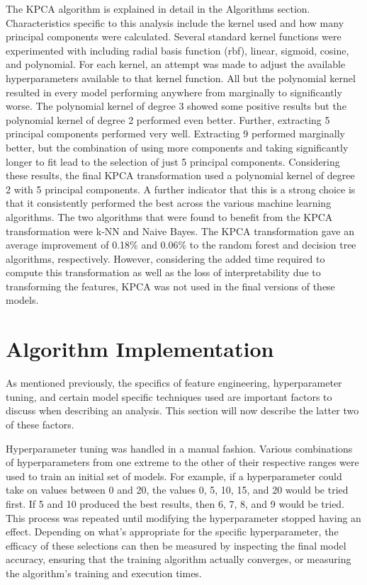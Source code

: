 The KPCA algorithm is explained in detail in the Algorithms section. Characteristics specific to this analysis include the kernel used and how many principal components were calculated. Several standard kernel functions were experimented with including radial basis function (rbf), linear, sigmoid, cosine, and polynomial. For each kernel, an attempt was made to adjust the available hyperparameters available to that kernel function. All but the polynomial kernel resulted in every model performing anywhere from marginally to significantly worse. The polynomial kernel of degree 3 showed some positive results but the polynomial kernel of degree 2 performed even better. Further, extracting 5 principal components performed very well. Extracting 9 performed marginally better, but the combination of using more components and taking significantly longer to fit lead to the selection of just 5 principal components. Considering these results, the final KPCA transformation used a polynomial kernel of degree 2 with 5 principal components. A further indicator that this is a strong choice is that it consistently performed the best across the various machine learning algorithms. The two algorithms that were found to benefit from the KPCA transformation were k-NN and Naive Bayes. The KPCA transformation gave an average improvement of 0.18\% and 0.06\% to the random forest and decision tree algorithms, respectively. However, considering the added time required to compute this transformation as well as the loss of interpretability due to transforming the features, KPCA was not used in the final versions of these models.



\section{Algorithm Implementation}
As mentioned previously, the specifics of feature engineering, hyperparameter tuning, and certain model specific techniques used are important factors to discuss when describing an analysis. This section will now describe the latter two of these factors.

Hyperparameter tuning was handled in a manual fashion. Various combinations of hyperparameters from one extreme to the other of their respective ranges were used to train an initial set of models. For example, if a hyperparameter could take on values between 0 and 20, the values 0, 5, 10, 15, and 20 would be tried first. If 5 and 10 produced the best results, then 6, 7, 8, and 9 would be tried. This process was repeated until modifying the hyperparameter stopped having an effect. Depending on what's appropriate for the specific hyperparameter, the efficacy of these selections can then be measured by inspecting the final model accuracy, ensuring that the training algorithm actually converges, or measuring the algorithm's training and execution times.

